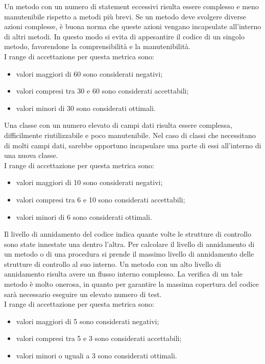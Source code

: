 			Un metodo con un numero di statement eccessivi risulta essere complesso e meno manutenibile rispetto a metodi più brevi. Se un metodo deve svolgere diverse azioni complesse, è buona norma che queste azioni vengano incapsulate all'interno di altri metodi. In questo modo si evita di appesantire il codice di un singolo metodo, favorendone la comprensibilità e la manutenibilità.\\
			I range di accettazione per questa metrica sono:
				\begin{itemize}
					\item valori maggiori di 60 sono considerati negativi;
					\item valori compresi tra 30 e 60 sono considerati accettabili;
					\item valori minori di 30 sono considerati ottimali.
				\end{itemize}
			Una classe con un numero elevato di campi dati risulta essere complessa, difficilmente riutilizzabile e poco manutenibile. Nel caso di classi che necessitano di molti campi dati, sarebbe opportuno incapsulare una parte di essi all'interno di una nuova classe.\\
			I range di accettazione per questa metrica sono:
				\begin{itemize}
					\item valori maggiori di 10 sono considerati negativi;
					\item valori compresi tra 6 e 10 sono considerati accettabili;
					\item valori minori di 6 sono considerati ottimali.
				\end{itemize}
			Il livello di annidamento del codice indica quante volte le strutture di controllo sono state innestate una dentro l'altra. Per calcolare il livello di annidamento di un metodo o di una procedura si prende il massimo livello di annidamento delle strutture di controllo al suo interno. Un metodo con un alto livello di annidamento risulta avere un flusso interno complesso. La verifica di un tale metodo è molto onerosa, in quanto per garantire la massima copertura del codice sarà necessario eseguire un elevato numero di test.\\
			I range di accettazione per questa metrica sono:
			\begin{itemize}
				\item valori maggiori di 5 sono considerati negativi;
				\item valori compresi tra 5 e 3 sono considerati accettabili;
				\item valori minori o uguali a 3 sono considerati ottimali.
			\end{itemize}
